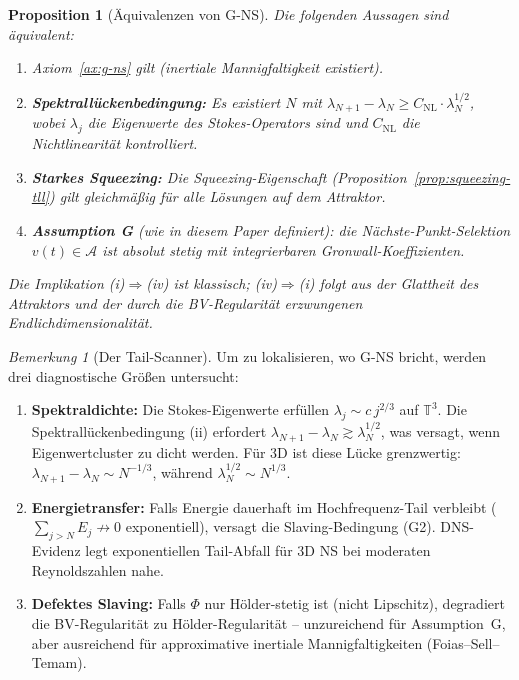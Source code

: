 \documentclass[12pt,a4paper]{article}
\theoremstyle{definition}
\theoremstyle{plain}
\newtheorem{proposition}[definition]{Proposition}
\theoremstyle{remark}
\newtheorem{remark}[definition]{Bemerkung}
\begin{document}
\begin{proposition}[\"Aquivalenzen von G-NS]\label{prop:g-equivalences}
Die folgenden Aussagen sind \"aquivalent:
\begin{enumerate}
\item[(i)] Axiom~\ref{ax:g-ns} gilt (inertiale Mannigfaltigkeit existiert).
\item[(ii)] \textbf{Spektrall\"uckenbedingung:} Es existiert $N$ mit $\lambda_{N+1} - \lambda_N \geq C_{\mathrm{NL}} \cdot \lambda_N^{1/2}$, wobei $\lambda_j$ die Eigenwerte des Stokes-Operators sind und $C_{\mathrm{NL}}$ die Nichtlinearit\"at kontrolliert.
\item[(iii)] \textbf{Starkes Squeezing:} Die Squeezing-Eigenschaft (Proposition~\ref{prop:squeezing-tll}) gilt gleichm\"a\ss ig f\"ur alle L\"osungen auf dem Attraktor.
\item[(iv)] \textbf{Assumption G} (wie in diesem Paper definiert): die N\"achste-Punkt-Selektion $v(t) \in \mathcal{A}$ ist absolut stetig mit integrierbaren Gronwall-Koeffizienten.
\end{enumerate}
Die Implikation (i)$\Rightarrow$(iv) ist klassisch; (iv)$\Rightarrow$(i) folgt aus der Glattheit des Attraktors und der durch die BV-Regularit\"at erzwungenen Endlichdimensionalit\"at.
\end{proposition}

\begin{remark}[Der Tail-Scanner]\label{rem:tail-scanner}
Um zu lokalisieren, wo G-NS bricht, werden drei diagnostische Gr\"o\ss en untersucht:
\begin{enumerate}
\item \textbf{Spektraldichte:} Die Stokes-Eigenwerte erf\"ullen $\lambda_j \sim c\, j^{2/3}$ auf $\mathbb{T}^3$. Die Spektrall\"uckenbedingung (ii) erfordert $\lambda_{N+1} - \lambda_N \gtrsim \lambda_N^{1/2}$, was versagt, wenn Eigenwertcluster zu dicht werden. F\"ur 3D ist diese L\"ucke grenzwertig: $\lambda_{N+1} - \lambda_N \sim N^{-1/3}$, w\"ahrend $\lambda_N^{1/2} \sim N^{1/3}$.
\item \textbf{Energietransfer:} Falls Energie dauerhaft im Hochfrequenz-Tail verbleibt ($\sum_{j > N} E_j \not\to 0$ exponentiell), versagt die Slaving-Bedingung (G2). DNS-Evidenz legt exponentiellen Tail-Abfall f\"ur 3D NS bei moderaten Reynoldszahlen nahe.
\item \textbf{Defektes Slaving:} Falls $\Phi$ nur H\"older-stetig ist (nicht Lipschitz), degradiert die BV-Regularit\"at zu H\"older-Regularit\"at -- unzureichend f\"ur Assumption~G, aber ausreichend f\"ur approximative inertiale Mannigfaltigkeiten (Foias--Sell--Temam).
\end{enumerate}
\end{remark}
\end{document}
